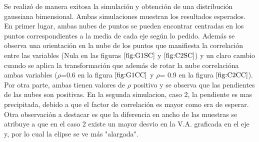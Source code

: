 Se realizó de manera exitosa la simulación y obtención de una distribución gaussiana bimensional. Ambas simulaciones muestran los resultados esperados. En primer lugar, ambas nubes de puntos se pueden encontrar centradas en los puntos correspondientes a la media de cada eje según lo pedido.
Además se observa una orientación en la nube de los puntos que manifiesta la correlación entre las variables (Nula en las figuras $\ref{fig:G1SC}$ y $\ref{fig:C2SC}$) y un claro cambio cuando se aplica la transformación que además de rotar la nube correlacióna ambas variables ($\rho$=0.6 en la figura $\ref{fig:G1CC}$ y $\rho$= 0.9 en la figura $\ref{fig:C2CC}$).
Por otra parte, ambas tienen valores de $\rho$ positivo y se observa que las pendientes de las nubes son positivas. En la segunda simulacion, caso 2, la pendiente es mas precipitada, debido a que el factor de correlación es mayor como era de esperar.
Otra observación a destacar es que la diferencia en ancho de las muestras se atribuye a que en el caso 2 existe un mayor desvio en la V.A. graficada en el eje y, por lo cual la elipse se ve más "alargada".
